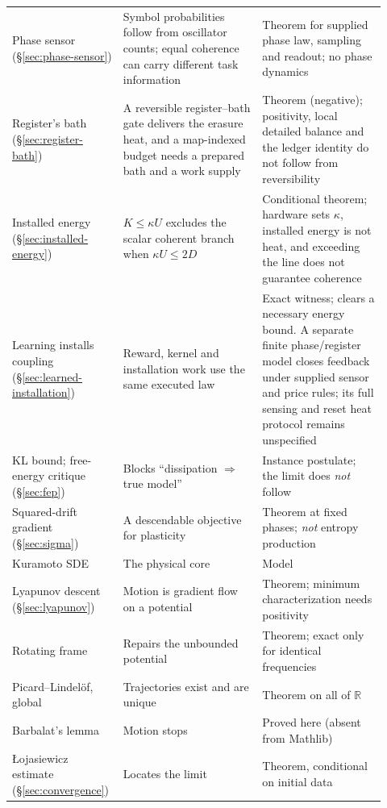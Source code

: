 \documentclass[11pt]{article}
\newcommand{\R}{\mathbb{R}}
\begin{document}
\begin{longtable}{@{}p{0.24\linewidth}p{0.36\linewidth}p{0.32\linewidth}@{}}
\raggedright Phase sensor (\S\ref{sec:phase-sensor}) & \raggedright Symbol probabilities follow from oscillator counts; equal coherence can carry different task information & \raggedright\arraybackslash Theorem for supplied phase law, sampling and readout; no phase dynamics \\
Register's bath (\S\ref{sec:register-bath}) & \raggedright A reversible register--bath gate delivers the erasure heat, and a map-indexed budget needs a prepared bath and a work supply & \raggedright\arraybackslash Theorem (negative); positivity, local detailed balance and the ledger identity do not follow from reversibility \\
Installed energy (\S\ref{sec:installed-energy}) & \raggedright $K\leq\kappa U$ excludes the scalar coherent branch when $\kappa U\leq2D$ & \raggedright\arraybackslash Conditional theorem; hardware sets $\kappa$, installed energy is not heat, and exceeding the line does not guarantee coherence \\
\raggedright Learning installs coupling (\S\ref{sec:learned-installation}) & \raggedright Reward, kernel and installation work use the same executed law & \raggedright\arraybackslash Exact witness; clears a necessary energy bound. A separate finite phase/register model closes feedback under supplied sensor and price rules; its full sensing and reset heat protocol remains unspecified \\
KL bound; free-energy critique (\S\ref{sec:fep}) & Blocks ``dissipation $\Rightarrow$ true model'' & Instance postulate; the limit does \emph{not} follow \\
Squared-drift gradient (\S\ref{sec:sigma}) & A descendable objective for plasticity & Theorem at fixed phases; \emph{not} entropy production \\
Kuramoto SDE & The physical core & Model \\
Lyapunov descent (\S\ref{sec:lyapunov}) & Motion is gradient flow on a potential & Theorem; minimum characterization needs positivity \\
Rotating frame & Repairs the unbounded potential & Theorem; exact only for identical frequencies \\
Picard--Lindel\"of, global & Trajectories exist and are unique & Theorem on all of $\R$ \\
Barbalat's lemma & Motion stops & Proved here (absent from Mathlib) \\
\L{}ojasiewicz estimate (\S\ref{sec:convergence}) & Locates the limit & Theorem, conditional on initial data \\

\end{longtable}
\end{document}
